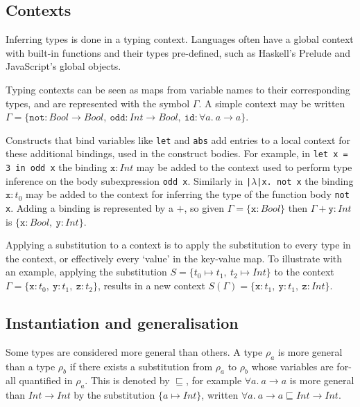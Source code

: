 \documentclass[a4paper,fleqn,oneside,12pt]{report}
\begin{document}
\subsection{Contexts}

Inferring types is done in a typing context. Languages often have a global context with built-in functions and their types pre-defined, such as Haskell’s Prelude and JavaScript’s global objects.

Typing contexts can be seen as maps from variable names to their corresponding types, and are represented with the symbol $\Gamma$. A simple context may be written $\Gamma = \{ \mathtt{not} : Bool \rightarrow Bool,\ \mathtt{odd} : Int \rightarrow Bool,\ \mathtt{id} : \forall a.\ a \rightarrow a \}$.

Constructs that bind variables like \texttt{let} and \texttt{abs} add entries to a local context for these additional bindings, used in the construct bodies. For example, in \texttt{let x = 3 in odd x} the binding $\mathtt{x} : Int$ may be added to the context used to perform type inference on the body subexpression \texttt{odd x}. Similarly in \texttt{|$\lambda$|x. not x} the binding $\mathtt{x} : t_0$ may be added to the context for inferring the type of the function body \texttt{not x}. Adding a binding is represented by a $+$, so given $\Gamma = \{ \mathtt{x} : Bool \}$ then $\Gamma + \mathtt{y} : Int$ is $\{ \mathtt{x} : Bool,\ \mathtt{y} : Int \}$.

Applying a substitution to a context is to apply the substitution to every type in the context, or effectively every `value' in the key-value map. To illustrate with an example, applying the substitution $S = \{ t_0 \mapsto t_1,\ t_2 \mapsto Int \}$ to the context $\Gamma = \{ \mathtt{x} : t_0,\ \mathtt{y} : t_1,\ \mathtt{z} : t_2 \}$, results in a new context $S(\Gamma) = \{ \mathtt{x} : t_1,\ \mathtt{y} : t_1,\ \mathtt{z} : Int \}$.

\subsection{Instantiation and generalisation}

Some types are considered more general than others. A type $\rho_a$ is more general than a type $\rho_b$ if there exists a substitution from $\rho_a$ to $\rho_b$ whose variables are for-all quantified in $\rho_a$. This is denoted by $\sqsubseteq$, for example $\forall a.\ a \rightarrow a$ is more general than $Int \rightarrow Int$ by the substitution $\{ a \mapsto Int \}$, written $\forall a.\ a \rightarrow a \sqsubseteq Int \rightarrow Int$.
\end{document}
